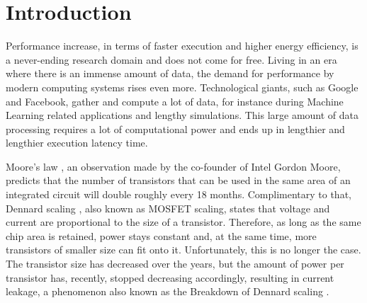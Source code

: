 \documentclass[]{usiinfthesis}
\begin{document}
\tableofcontents 

\mainmatter

%
%
%  
%
%
%

\chapter*{Introduction}

Performance increase, in terms of faster execution and higher energy efficiency, 
is a never-ending research domain and does not come for free.
Living in an era where there is an immense amount of data, the demand for %
performance by modern computing systems rises even more.
Technological giants, such as Google and Facebook, gather and compute a lot of data, for instance 
during Machine Learning related applications and lengthy simulations. This large amount of data
processing requires a lot of computational power and ends up in lengthier and lengthier execution
latency time.\par

Moore's law \cite{schaller1997moore}, an observation made by the co-founder of Intel Gordon Moore, 
predicts that the number of transistors that can be used in the same area of an integrated 
circuit will double roughly every 18 months. Complimentary to that, Dennard scaling 
\cite{dennard1974design}, 
also known as MOSFET scaling, states that voltage and current are 
proportional to the size of a transistor. Therefore, as long as the same chip area is retained, 
power stays constant and, at the same time, more transistors of smaller size can fit onto it.
Unfortunately, this is no longer the case. The transistor size has decreased over 
the years, but the amount of power per transistor has, recently, stopped decreasing accordingly,  
resulting in current leakage, a phenomenon also known as the 
Breakdown of Dennard scaling \cite{esmaeilzadeh2011dark}.\par
\end{document}

